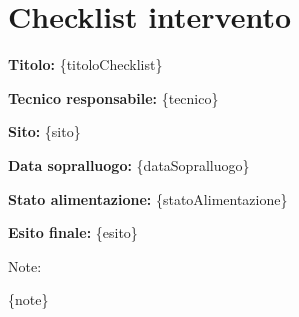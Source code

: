 \documentclass[11pt,a4paper]{article}
\begin{document}
\section*{Checklist intervento}

\textbf{Titolo:} \{titoloChecklist\}

\textbf{Tecnico responsabile:} \{tecnico\}

\textbf{Sito:} \{sito\}

\textbf{Data sopralluogo:} \{dataSopralluogo\}

\vspace{0.6cm}
\textbf{Stato alimentazione:} \{statoAlimentazione\}

\textbf{Esito finale:} \{esito\}

\vspace{1cm}
Note:

\{note\}
\end{document}
